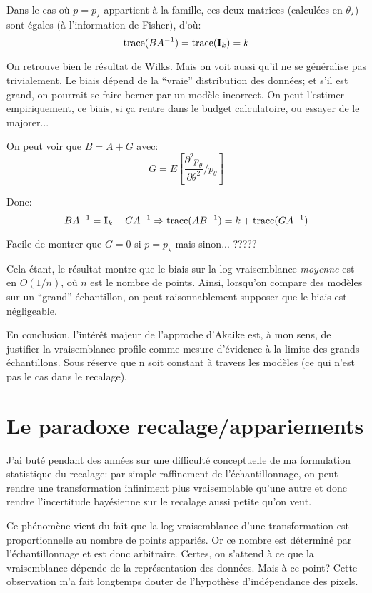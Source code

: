 \documentclass{article}
\begin{document}
Dans le cas o\`u $p=p_\star$ appartient \`a la famille, ces deux matrices (calcul\'ees en $\theta_\star$) sont \'egales (\`a l'information de Fisher), d'o\`u: 
$$
{\rm trace}(B A^{-1}) = {\rm trace}({\bf I}_k) = k
$$ 

On retrouve bien le r\'esultat de Wilks. Mais on voit aussi qu'il ne se g\'en\'eralise pas trivialement. Le biais d\'epend de la ``vraie'' distribution des donn\'ees; et s'il est grand, on pourrait se faire berner par un mod\`ele incorrect. On peut l'estimer empiriquement, ce biais, si \c{c}a rentre dans le budget calculatoire, ou essayer de le majorer... 

On peut voir que $B = A + G$ avec:
$$
G = E[\frac{\partial^2 p_\theta}{\partial\theta^2}\big / p_\theta]
$$ 

Donc:
$$B A^{-1} = {\bf I}_k + G A^{-1}
\Rightarrow
{\rm trace}(A B^{-1}) = k + {\rm trace}(G A^{-1})
$$ 

Facile de montrer que $G=0$ si $p=p_\star$ mais sinon... ????? 

Cela \'etant, le r\'esultat montre que le biais sur la log-vraisemblance {\em moyenne} est en $O(1/n)$, o\`u $n$ est le nombre de points. Ainsi, lorsqu'on compare des mod\`eles sur un ``grand'' \'echantillon, on peut raisonnablement supposer que le biais est n\'egligeable. 

En conclusion, l'int\'er\^et majeur de l'approche d'Akaike est, \`a mon sens, de justifier la vraisemblance profile comme mesure d'\'evidence \`a la limite des grands \'echantillons. Sous r\'eserve que n soit constant \`a travers les mod\`eles (ce qui n'est pas le cas dans le recalage). 



\section{Le paradoxe recalage/appariements}

J'ai but\'e pendant des ann\'ees sur une difficult\'e conceptuelle de ma formulation statistique du recalage: par simple raffinement de l'\'echantillonnage, on peut rendre une transformation infiniment plus vraisemblable qu'une autre et donc rendre l'incertitude bay\'esienne sur le recalage aussi petite qu'on veut. 

Ce ph\'enom\`ene vient du fait que la log-vraisemblance d'une transformation est proportionnelle au nombre de points appari\'es. Or ce nombre est d\'etermin\'e par l'\'echantillonnage et est donc arbitraire. Certes, on s'attend \`a ce que la vraisemblance d\'epende de la repr\'esentation des donn\'ees. Mais \`a ce point? Cette observation m'a fait longtemps douter de l'hypoth\`ese d'ind\'ependance des pixels. 
\end{document}
